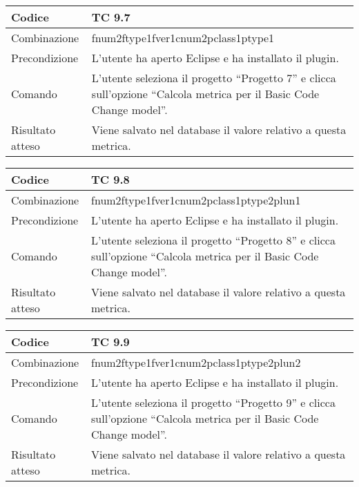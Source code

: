 \begin{table}[ht]
\begin{tabular}{|p{3cm}|p{9cm}|}
\hline
\cellcolor{lightgray}Codice				& TC 9.7								\\
\hline
\cellcolor{lightgray}Combinazione		& fnum2ftype1fver1cnum2pclass1ptype1									\\
\hline
\cellcolor{lightgray}Precondizione		& L'utente ha aperto Eclipse e ha installato il plugin.		\\
\hline
\cellcolor{lightgray}Comando			& L'utente seleziona il progetto ``Progetto 7''  e clicca sull'opzione ``Calcola metrica per il Basic Code Change model''.	\\
\hline
\cellcolor{lightgray}Risultato atteso	& Viene salvato nel database il valore relativo a questa metrica.\\
\hline
\end{tabular}
\end{table}

\clearpage

\begin{table}[ht]
\begin{tabular}{|p{3cm}|p{9cm}|}
\hline
\cellcolor{lightgray}Codice				& TC 9.8								\\
\hline
\cellcolor{lightgray}Combinazione		& fnum2ftype1fver1cnum2pclass1ptype2plun1									\\
\hline
\cellcolor{lightgray}Precondizione		& L'utente ha aperto Eclipse e ha installato il plugin.		\\
\hline
\cellcolor{lightgray}Comando			& L'utente seleziona il progetto ``Progetto 8''  e clicca sull'opzione ``Calcola metrica per il Basic Code Change model''.	\\
\hline
\cellcolor{lightgray}Risultato atteso	& Viene salvato nel database il valore relativo a questa metrica.\\
\hline
\end{tabular}
\end{table}

\begin{table}[ht]
\begin{tabular}{|p{3cm}|p{9cm}|}
\hline
\cellcolor{lightgray}Codice				& TC 9.9								\\
\hline
\cellcolor{lightgray}Combinazione		& fnum2ftype1fver1cnum2pclass1ptype2plun2									\\
\hline
\cellcolor{lightgray}Precondizione		& L'utente ha aperto Eclipse e ha installato il plugin.		\\
\hline
\cellcolor{lightgray}Comando			& L'utente seleziona il progetto ``Progetto 9''  e clicca sull'opzione ``Calcola metrica per il Basic Code Change model''.	\\
\hline
\cellcolor{lightgray}Risultato atteso	& Viene salvato nel database il valore relativo a questa metrica.\\
\hline
\end{tabular}
\end{table}

